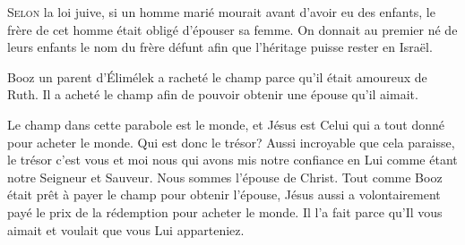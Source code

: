




\lettrine{S}{elon} la loi juive, si un homme marié mourait 
 avant d'avoir eu des enfants, le frère de cet homme était obligé
 d'épouser sa femme.
 On donnait au premier né de leurs enfants le nom du frère défunt
 afin que l'héritage puisse rester en Israël.

Booz \ocadr un parent d'Élimélek \fcadr{} a racheté le champ parce
 qu'il était amoureux de Ruth.
 Il a acheté le champ afin de pouvoir obtenir une épouse qu'il aimait.


Le champ dans cette parabole est le monde, et Jésus est Celui
 qui a tout donné pour acheter le monde. Qui est donc le trésor?
 Aussi incroyable que cela paraisse, le trésor c'est vous et moi
 \ocadr nous qui avons mis notre confiance en Lui comme étant notre Seigneur
 et Sauveur.
 Nous sommes l'épouse de Christ.
 Tout comme Booz était prêt à payer le champ pour obtenir l'épouse,
 Jésus aussi a volontairement payé le prix de la rédemption
 pour acheter le monde.
 Il l'a fait parce qu'Il vous aimait et voulait que vous Lui apparteniez. 

\dvrule





